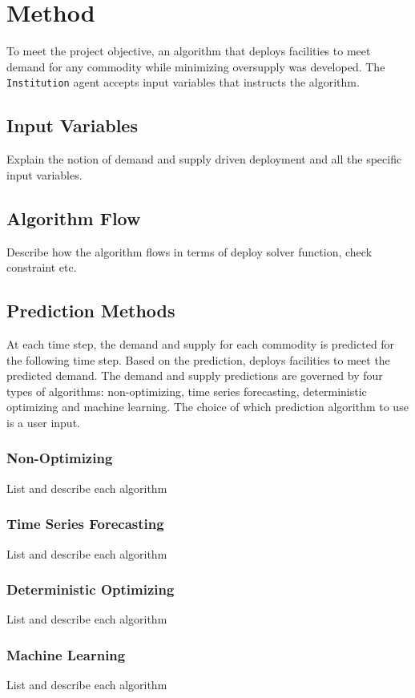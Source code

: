 \section{Method}
To meet the project objective, an algorithm that deploys 
facilities to meet demand for any commodity while 
minimizing oversupply was developed. 
The \texttt{Institution} agent accepts input variables that instructs
the algorithm. 

\subsection{Input Variables}
Explain the notion of demand and supply driven deployment 
and all the specific input variables. 

\subsection{Algorithm Flow}
Describe how the algorithm flows in terms of deploy solver function, 
check constraint etc. 

\subsection{Prediction Methods}
At each time step, the demand and supply for each commodity is 
predicted for the following time step. 
Based on the prediction, \deploy deploys facilities to meet the 
predicted demand. 
The demand and supply predictions are governed by four types
of algorithms: non-optimizing, time series forecasting, 
deterministic optimizing and machine learning. 
The choice of which prediction algorithm to use is a user input. 

\subsubsection{Non-Optimizing}
List and describe each algorithm 

\subsubsection{Time Series Forecasting}
List and describe each algorithm 

\subsubsection{Deterministic Optimizing}
List and describe each algorithm 

\subsubsection{Machine Learning}
List and describe each algorithm 

